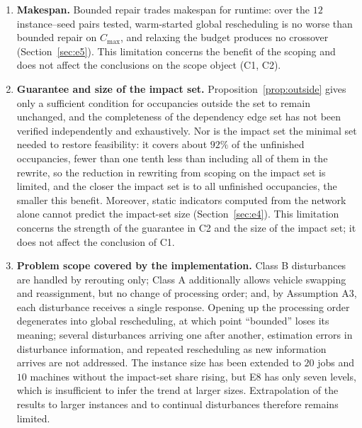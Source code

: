 \documentclass[manuscript,screen,review]{acmart}
\newcommand{\EfiveCells}{12}        %
\newcommand{\ClosureAliveFrac}{92\%}
\newcommand{\ScaleJobsHi}{20}
\newcommand{\ScaleMachHi}{10}
\begin{document}
\begin{enumerate}[leftmargin=1.6em,itemsep=0.35em]
\item \textbf{Makespan.} Bounded repair trades makespan for runtime: over the \(\EfiveCells\) instance--seed pairs tested,
warm-started global rescheduling is no worse than bounded repair on \(C_{\max}\), and relaxing the budget produces no crossover (Section~\ref{sec:e5}).
This limitation concerns the benefit of the scoping and does not affect the conclusions on the scope object (C1, C2).

\item \textbf{Guarantee and size of the impact set.} Proposition~\ref{prop:outside} gives only a sufficient condition for occupancies outside the set to remain unchanged,
and the completeness of the dependency edge set has not been verified independently and exhaustively. Nor is the impact set the minimal set needed to restore feasibility:
it covers about \(\ClosureAliveFrac\) of the unfinished occupancies, fewer than one tenth less than including all of them in the rewrite,
so the reduction in rewriting from scoping on the impact set is limited, and the closer the impact set is to all unfinished occupancies, the smaller this benefit.
Moreover, static indicators computed from the network alone cannot predict the impact-set size (Section~\ref{sec:e4}).
This limitation concerns the strength of the guarantee in C2 and the size of the impact set; it does not affect the conclusion of C1.

\item \textbf{Problem scope covered by the implementation.} Class B disturbances are handled by rerouting only; Class A additionally allows vehicle swapping and reassignment, but no change of processing order;
and, by Assumption A3, each disturbance receives a single response. Opening up the processing order degenerates into global rescheduling, at which point ``bounded'' loses its meaning;
several disturbances arriving one after another, estimation errors in disturbance information, and repeated rescheduling as new information arrives are not addressed.
The instance size has been extended to \(\ScaleJobsHi\) jobs and \(\ScaleMachHi\) machines without the impact-set share rising,
but E8 has only seven levels, which is insufficient to infer the trend at larger sizes. Extrapolation of the results to larger instances and to continual disturbances therefore remains limited.


\end{enumerate}
\end{document}
